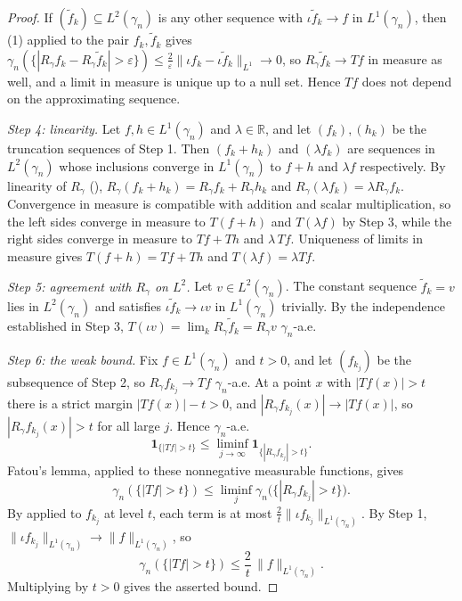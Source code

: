 \begin{proof}
If $(\tilde f_k) \subseteq L^2(\gamma_n)$ is any other sequence with
$\iota\tilde f_k \to f$ in $L^1(\gamma_n)$, then (1) applied to the pair
$f_k, \tilde f_k$ gives
$\gamma_n(\{|R_\gamma f_k - R_\gamma\tilde f_k| > \varepsilon\}) \leq
\tfrac{2}{\varepsilon}\|\iota f_k - \iota \tilde f_k\|_{L^1} \to 0$, so
$R_\gamma \tilde f_k \to Tf$ in measure as well, and a limit in measure is unique
up to a null set.  Hence $Tf$ does not depend on the approximating sequence.

\emph{Step 4: linearity.}
Let $f, h \in L^1(\gamma_n)$ and $\lambda \in \mathbb{R}$, and let
$(f_k), (h_k)$ be the truncation sequences of Step 1.  Then
$(f_k + h_k)$ and $(\lambda f_k)$ are sequences in $L^2(\gamma_n)$ whose
inclusions converge in $L^1(\gamma_n)$ to $f + h$ and $\lambda f$ respectively.
By linearity of $R_\gamma$ (),
$R_\gamma(f_k+h_k) = R_\gamma f_k + R_\gamma h_k$ and
$R_\gamma(\lambda f_k) = \lambda R_\gamma f_k$.  Convergence in measure is
compatible with addition and scalar multiplication, so the left sides converge in
measure to $T(f+h)$ and $T(\lambda f)$ by Step 3, while the right sides converge
in measure to $Tf + Th$ and $\lambda\,Tf$.  Uniqueness of limits in measure gives
$T(f+h) = Tf + Th$ and $T(\lambda f) = \lambda Tf$.

\emph{Step 5: agreement with $R_\gamma$ on $L^2$.}
Let $v \in L^2(\gamma_n)$.  The constant sequence $\tilde f_k = v$ lies in
$L^2(\gamma_n)$ and satisfies $\iota \tilde f_k \to \iota v$ in $L^1(\gamma_n)$
trivially.  By the independence established in Step 3,
$T(\iota v) = \lim_k R_\gamma \tilde f_k = R_\gamma v$ $\gamma_n$-a.e.

\emph{Step 6: the weak bound.}
Fix $f \in L^1(\gamma_n)$ and $t > 0$, and let $(f_{k_j})$ be the subsequence of
Step 2, so $R_\gamma f_{k_j} \to Tf$ $\gamma_n$-a.e.  At a point $x$ with
$|Tf(x)| > t$ there is a strict margin $|Tf(x)| - t > 0$, and
$|R_\gamma f_{k_j}(x)| \to |Tf(x)|$, so $|R_\gamma f_{k_j}(x)| > t$ for all large
$j$.  Hence $\gamma_n$-a.e.
\[
  \mathbf{1}_{\{|Tf|>t\}} \leq \liminf_{j\to\infty}\mathbf{1}_{\{|R_\gamma f_{k_j}|>t\}} .
\]
Fatou's lemma, applied to these nonnegative measurable functions, gives
\[
  \gamma_n(\{|Tf|>t\})
    \leq \liminf_{j} \gamma_n\bigl(\{|R_\gamma f_{k_j}| > t\}\bigr) .
\]
By  applied to $f_{k_j}$ at level $t$, each term is at most
$\tfrac{2}{t}\|\iota f_{k_j}\|_{L^1(\gamma_n)}$.  By Step 1,
$\|\iota f_{k_j}\|_{L^1(\gamma_n)} \to \|f\|_{L^1(\gamma_n)}$, so
\[
  \gamma_n(\{|Tf|>t\}) \leq \frac{2}{t}\,\|f\|_{L^1(\gamma_n)} .
\]
Multiplying by $t > 0$ gives the asserted bound.
\end{proof}
